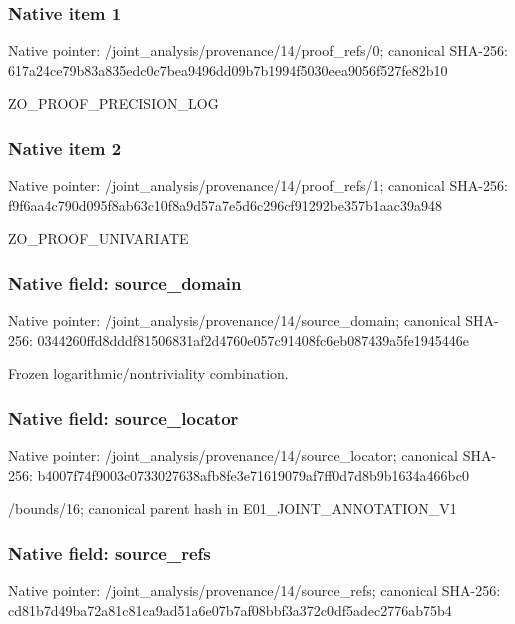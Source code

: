 \documentclass[10pt,a4paper]{article}
\begin{document}
\subsubsection{Native item 1}
Native pointer: /joint\_\allowbreak{}analysis/provenance/14/proof\_\allowbreak{}refs/0; canonical SHA-256: 617a24ce79b83a835edc0c7bea9496dd09b7b1994f5030eea9056f527fe82b10

\begingroup\raggedright\sloppy ZO\_\allowbreak{}PROOF\_\allowbreak{}PRECISION\_\allowbreak{}LOG\par\endgroup

\subsubsection{Native item 2}
Native pointer: /joint\_\allowbreak{}analysis/provenance/14/proof\_\allowbreak{}refs/1; canonical SHA-256: f9f6aa4c790d095f8ab63c10f8a9d57a7e5d6c296cf91292be357b1aac39a948

\begingroup\raggedright\sloppy ZO\_\allowbreak{}PROOF\_\allowbreak{}UNIVARIATE\par\endgroup

\subsubsection{Native field: source\_\allowbreak{}domain}
Native pointer: /joint\_\allowbreak{}analysis/provenance/14/source\_\allowbreak{}domain; canonical SHA-256: 0344260ffd8dddf81506831af2d4760e057c91408fc6eb087439a5fe1945446e

\begingroup\raggedright\sloppy Frozen logarithmic/\allowbreak{}nontriviality combination.\par\endgroup

\subsubsection{Native field: source\_\allowbreak{}locator}
Native pointer: /joint\_\allowbreak{}analysis/provenance/14/source\_\allowbreak{}locator; canonical SHA-256: b4007f74f9003c0733027638afb8fe3e71619079af7ff0d7d8b9b1634a466bc0

\begingroup\raggedright\sloppy /\allowbreak{}bounds/\allowbreak{}16;\allowbreak{} canonical parent hash in E01\_\allowbreak{}JOINT\_\allowbreak{}ANNOTATION\_\allowbreak{}V1\par\endgroup

\subsubsection{Native field: source\_\allowbreak{}refs}
Native pointer: /joint\_\allowbreak{}analysis/provenance/14/source\_\allowbreak{}refs; canonical SHA-256: cd81b7d49ba72a81c81ca9ad51a6e07b7af08bbf3a372c0df5adec2776ab75b4
\end{document}
